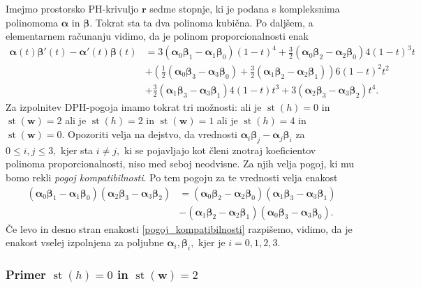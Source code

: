 \documentclass[12pt,a4paper,twoside]{article}
\theoremstyle{definition} %
\theoremstyle{plain} %
\theoremstyle{primerstyle}
\numberwithin{equation}{section}  %
\newcommand{\rV}{\mathbf{r}}
\newcommand{\wV}{\mathbf{w}}
\newcommand{\balpha}{\boldsymbol \alpha}
\newcommand{\bbeta}{\boldsymbol \beta}
\DeclareMathOperator{\st}{st}
\begin{document}
Imejmo prostorsko PH-krivuljo $\rV$ sedme stopnje, ki je podana s kompleksnima polinomoma $\balpha$ in $\bbeta.$ Tokrat sta ta dva polinoma kubična. Po daljšem, a elementarnem računanju vidimo, da je polinom proporcionalnosti enak
\begin{align}
	\balpha(t)\bbeta'(t)-\balpha'(t)\bbeta(t)&=3(\balpha_0\bbeta_1-\balpha_1\bbeta_0)(1-t)^4+\frac{3}{2}(\balpha_0\bbeta_2-\balpha_2\bbeta_0)4(1-t)^3t\nonumber\\
	&+\left(\frac{1}{2}(\balpha_0\bbeta_3-\balpha_3\bbeta_0)+\frac{3}{2}(\balpha_1\bbeta_2-\balpha_2\bbeta_1)\right)6(1-t)^2t^2\label{propoly_bern_7}\\
	&+\frac{3}{2}(\balpha_1\bbeta_3-\balpha_3\bbeta_1)4(1-t)t^3+3(\balpha_2\bbeta_3-\balpha_3\bbeta_2)t^4.\nonumber
\end{align}
Za izpolnitev DPH-pogoja imamo tokrat tri možnosti: ali je $\st(h)=0$ in $\st(\wV)=2$ ali je $\st(h)=2$ in $\st(\wV)=1$ ali je $\st(h)=4$ in $\st(\wV)=0.$ Opozoriti velja na dejstvo, da vrednosti $\balpha_i\bbeta_j-\balpha_j\bbeta_i$ za $0\leq i,j\leq 3,$ kjer sta $i\neq j,$ ki se pojavljajo kot členi znotraj koeficientov polinoma proporcionalnosti, niso med seboj neodvisne. Za njih velja pogoj, ki mu bomo rekli \emph{pogoj kompatibilnosti}. Po tem pogoju za te vrednosti velja enakost
\begin{align}
	(\balpha_0\bbeta_1-\balpha_1\bbeta_0)(\balpha_2\bbeta_3-\balpha_3\bbeta_2)&=(\balpha_0\bbeta_2-\balpha_2\bbeta_0)(\balpha_1\bbeta_3-\balpha_3\bbeta_1)\nonumber\\
	&-(\balpha_1\bbeta_2-\balpha_2\bbeta_1)(\balpha_0\bbeta_3-\balpha_3\bbeta_0).\label{pogoj_kompatibilnosti}
\end{align}
Če levo in desno stran enakosti \eqref{pogoj_kompatibilnosti} razpišemo, vidimo, da je enakost vselej izpolnjena za poljubne $\balpha_i,\bbeta_i,$ kjer je $i=0,1,2,3.$

\subsubsection{Primer \texorpdfstring{$\st(h)=0$}{st(h)=0} in \texorpdfstring{$\st(\wV)=2$}{st(w)=2}}
\label{klasifikacija_h0w2}
\end{document}
